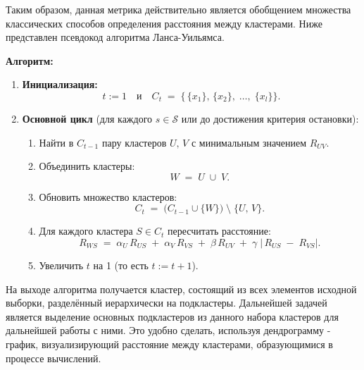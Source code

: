 Таким образом, данная метрика действительно является обобщением множества классических способов определения расстояния между кластерами. Ниже представлен псевдокод алгоритма Ланса-Уильямса.

\noindent
\textbf{Алгоритм:}
\begin{enumerate}
    \item \textbf{Инициализация:}
          \[
              t := 1
              \quad\text{и}\quad
              C_t \;=\;\{\,\{x_1\},\,\{x_2\},\;\ldots,\;\{x_l\}\}.
          \]
          
    \item \textbf{Основной цикл} (для каждого $s \in \mathcal{S}$ или до достижения критерия остановки):
          \begin{enumerate}
              \item Найти в $C_{t-1}$ пару кластеров $U,\,V$ с минимальным значением $R_{UV}$.
              \item Объединить кластеры:
                    \[
                        W \;=\; U \;\cup\; V.
                    \]
              \item Обновить множество кластеров:
                    \[
                        C_t \;=\; \bigl(C_{t-1} \cup \{W\}\bigr)\;\setminus\;\{U,\,V\}.
                    \]
              \item Для каждого кластера $S \in C_t$ пересчитать расстояние:
                    \[
                        R_{WS} \;=\;
                        \alpha_U\,R_{US}
                        \;+\;
                        \alpha_V\,R_{VS}
                        \;+\;
                        \beta\,R_{UV}
                        \;+\;
                        \gamma\;\bigl|\,R_{US}\;-\;R_{VS}\bigr|.
                    \]
              \item Увеличить $t$ на 1 (то есть $t := t + 1$).
          \end{enumerate}
\end{enumerate}

На выходе алгоритма получается кластер, состоящий из всех элементов исходной выборки, разделённый иерархически на подкластеры. Дальнейшей задачей является выделение основных подкластеров из данного набора кластеров для дальнейшей работы с ними. Это удобно сделать, используя дендрограмму - график, визуализирующий расстояние между кластерами, образующимися в процессе вычислений.

